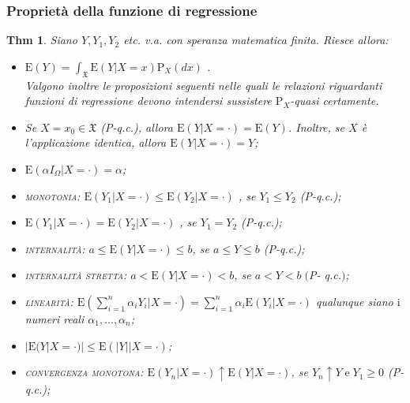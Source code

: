 \documentclass[a4paper,11pt]{article}
\theoremstyle{plain}
\newtheorem{thm}{Thm}[section]
\theoremstyle{definition}
\theoremstyle{remark}
\begin{document}
\subsubsection{Proprietà della funzione di regressione}
\begin{thm}Siano $Y, Y_{1}, Y_{2}$ etc. v.a. con speranza matematica finita. Riesce allora:

\begin{itemize}

\item $\displaystyle \mathrm{E}(Y)=\int_{\mathfrak{X}}\mathrm{E}(Y|X=x)\mathrm{P}_{X}(dx)$ .\\
\noindent
Valgono inoltre le proposizioni seguenti nelle quali le relazioni riguardanti funzioni di regressione devono intendersi sussistere $\mathrm{P}_{X}$-quasi certamente.

\item Se $X=x_{0}\in \mathfrak{X}$ (P-q.c.), allora $\mathrm{E}(Y|X=\cdot)=\mathrm{E}(Y)$. Inoltre, se $X$ \`{e} l'applicazione identica, allora $\mathrm{E}(Y|X=\cdot)=Y$;

\item $ \mathrm{E}(\alpha I_{\Omega}|X=\cdot)=\alpha$;

\item \textsc{monotonia}: $\mathrm{E}(Y_{1}|X=\cdot)\leq \mathrm{E}(Y_{2}|X=\cdot)$ , se $Y_{1}\leq Y_{2}$ (P-q.c.);

\item $\mathrm{E}(Y_{1}|X=\cdot)=\mathrm{E}(Y_{2}|X=\cdot)$ , se $Y_{1}=Y_{2}$ (P-q.c.);

\item \textsc{internalità}: $a\leq \mathrm{E}(Y|X=\cdot)\leq b$, se $a\leq Y\leq b$ (P-q.c.);

\item  \textsc{internalità stretta}: $a<\mathrm{E}(Y|X=\cdot )<b$, se $a<Y<b \; ($P- q.c.$)$;

\item \textsc{linearità}: $\displaystyle \mathrm{E}(\sum_{i=1}^{n}\alpha_{i}Y_{i}|X=\cdot)=\sum_{i=1}^{n}\alpha_{i}\mathrm{E}(Y_{i}|X=\cdot)$ qualunque siano $\mathrm{i}$ numeri reali $\alpha_{1}, \ldots, \alpha_{n}$;

\item $|\mathrm{E}(Y|X=\cdot)|\leq \mathrm{E}(|Y||X=\cdot)$;

\item \textsc{convergenza monotona}: $\mathrm{E}(Y_{n}|X=\cdot)\uparrow \mathrm{E}(Y|X=\cdot)$, se $Y_{n}\uparrow Y\mathrm{\; e \;} Y_{1}\geq 0$ (P-q.c.);


\end{itemize}
\end{thm}
\end{document}
